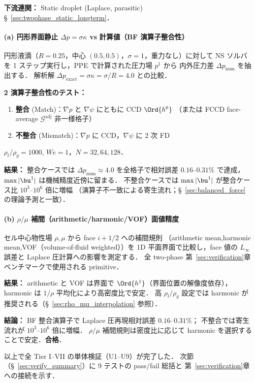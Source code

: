 \noindent\textbf{下流連関：}
Static droplet (Laplace, parasitic) §~\ref{sec:twophase_static_longterm}．

\paragraph{(a) 円形界面静止 $\Delta p = \sigma\kappa$ vs 計算値（BF 演算子整合性）}
\label{sec:U7_laplace_pressure}

円形液滴（$R = 0.25$，中心 $(0.5, 0.5)$，$\sigma = 1$，重力なし）に対して
NS ソルバを 1 ステップ実行し，PPE で計算された圧力場 $p^1$ から
内外圧力差 $\Delta p_\mathrm{num}$ を抽出する．
解析解 $\Delta p_\mathrm{exact} = \sigma\kappa = \sigma/R = 4.0$ との比較．

\noindent\textbf{2 演算子整合性のテスト：}
\begin{enumerate}[noitemsep]
  \item \textbf{整合} (Match)：$\nabla p$ と $\nabla\psi$ にともに CCD $\Ord{h^6}$
        （または FCCD face-average $\mathcal{G}^\text{adj}$ 非一様格子）
  \item \textbf{不整合} (Mismatch)：$\nabla p$ に CCD，$\nabla\psi$ に 2 次 FD
\end{enumerate}
$\rho_l/\rho_g = 1000$, $\mathit{We} = 1$，$N = 32, 64, 128$．

\noindent\textbf{結果：}
整合ケースでは $\Delta p_\mathrm{num} \approx 4.0$ を全格子で相対誤差
$0.16$--$0.31\%$ で達成，$\max|\bu^1|$ は機械精度近傍に留まる．
不整合ケースでは $\max|\bu^1|$ が整合ケース比 $10^3$--$10^6$ 倍に増幅
（演算子不一致による寄生流れ；§~\ref{sec:balanced_force} の理論予測と一致）．

\paragraph{(b) $\rho/\mu$ 補間（arithmetic/harmonic/VOF）面値精度}
\label{sec:U7_rho_mu_interp}

セル中心物性場 $\rho, \mu$ から face $i+1/2$ への補間規則
（arithmetic mean,harmonic mean,VOF（volume-of-fluid weighted））を
1D 平面界面で比較し，face 値の $L_\infty$ 誤差と Laplace 圧計算への影響を測定する．
全 two-phase 第~\ref{sec:verification}章 ベンチマークで使用される primitive．

\noindent\textbf{結果：}
arithmetic と VOF は界面で $\Ord{h^1}$（界面位置の解像度依存），
harmonic は $1/\rho$ 平均化により高密度比で安定．
高 $\rho_l/\rho_g$ 設定では harmonic が推奨される（§~\ref{sec:rho_mu_interpolation} 参照）．

\noindent\textbf{結論：}
BF 整合演算子で Laplace 圧再現相対誤差 $0.16$--$0.31\%$；
不整合では寄生流れが $10^3$--$10^6$ 倍に増幅．
$\rho/\mu$ 補間規則は密度比に応じて harmonic を選択することで安定．\textbf{合格}．

\medskip
以上で全 Tier I--VII の単体検証（U1--U9）が完了した．
次節（§~\ref{sec:verify_summary}）に 9 テストの pass/fail 総括と
第~\ref{sec:verification}章 への接続を示す．
